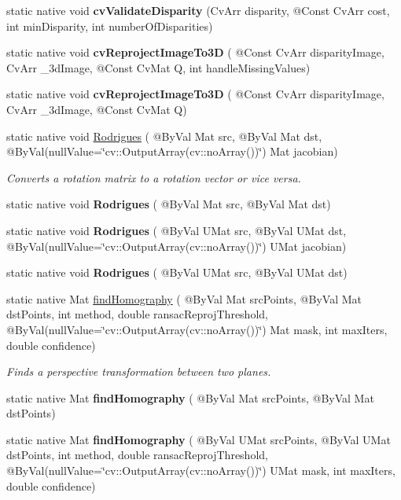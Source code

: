 \begin{DoxyCompactItemize}
\item 
static native void {\bfseries cv\+Validate\+Disparity} (Cv\+Arr disparity, @Const Cv\+Arr cost, int min\+Disparity, int number\+Of\+Disparities)
\item 
static native void {\bfseries cv\+Reproject\+Image\+To3D} ( @Const Cv\+Arr disparity\+Image, Cv\+Arr \+\_\+3d\+Image, @Const Cv\+Mat Q, int handle\+Missing\+Values)
\item 
static native void {\bfseries cv\+Reproject\+Image\+To3D} ( @Const Cv\+Arr disparity\+Image, Cv\+Arr \+\_\+3d\+Image, @Const Cv\+Mat Q)
\item 
static native void \hyperlink{group__calib3d_ga20092873ec8f2850a2df8acb2648de68}{Rodrigues} ( @By\+Val Mat src, @By\+Val Mat dst, @By\+Val(null\+Value=\char`\"{}cv\+::\+Output\+Array(cv\+::no\+Array())\char`\"{}) Mat jacobian)
\begin{DoxyCompactList}\small\item\em Converts a rotation matrix to a rotation vector or vice versa. \end{DoxyCompactList}\item 
static native void {\bfseries Rodrigues} ( @By\+Val Mat src, @By\+Val Mat dst)
\item 
static native void {\bfseries Rodrigues} ( @By\+Val U\+Mat src, @By\+Val U\+Mat dst, @By\+Val(null\+Value=\char`\"{}cv\+::\+Output\+Array(cv\+::no\+Array())\char`\"{}) U\+Mat jacobian)
\item 
static native void {\bfseries Rodrigues} ( @By\+Val U\+Mat src, @By\+Val U\+Mat dst)
\item 
static native Mat \hyperlink{group__calib3d_ga2e20e41b600c13c08d376e5df367f480}{find\+Homography} ( @By\+Val Mat src\+Points, @By\+Val Mat dst\+Points, int method, double ransac\+Reproj\+Threshold, @By\+Val(null\+Value=\char`\"{}cv\+::\+Output\+Array(cv\+::no\+Array())\char`\"{}) Mat mask, int max\+Iters, double confidence)
\begin{DoxyCompactList}\small\item\em Finds a perspective transformation between two planes. \end{DoxyCompactList}\item 
static native Mat {\bfseries find\+Homography} ( @By\+Val Mat src\+Points, @By\+Val Mat dst\+Points)
\item 
static native Mat {\bfseries find\+Homography} ( @By\+Val U\+Mat src\+Points, @By\+Val U\+Mat dst\+Points, int method, double ransac\+Reproj\+Threshold, @By\+Val(null\+Value=\char`\"{}cv\+::\+Output\+Array(cv\+::no\+Array())\char`\"{}) U\+Mat mask, int max\+Iters, double confidence)

\end{DoxyCompactItemize}
